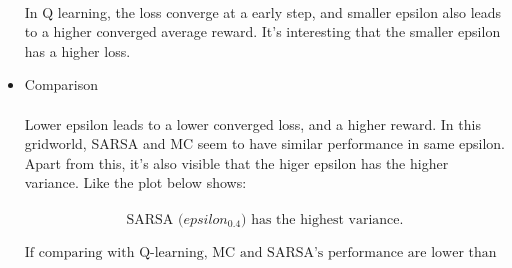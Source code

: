 \documentclass[a4paper]{article}
\begin{document}
\begin{answer}
\begin{itemize}
				\\
				In Q learning, the loss converge at a early step, and smaller epsilon also leads to a higher converged average reward. It's interesting that the smaller epsilon has a higher loss. 
			\item Comparison\\
				\\
				Lower epsilon leads to a lower converged loss, and a higher reward. In this gridworld, SARSA and MC seem to have similar performance in same epsilon. Apart from this, it's also visible that the higer epsilon has the higher variance. Like the plot below shows:\\
				\\
				\[\text{SARSA ($epsilon_{0.4}$) has the highest variance.}\]
				\\
				\[\text{If comparing with Q-learning, MC and SARSA's performance are lower than Q-learning.}\]

		\end{itemize}
    \end{answer}
\end{document}
